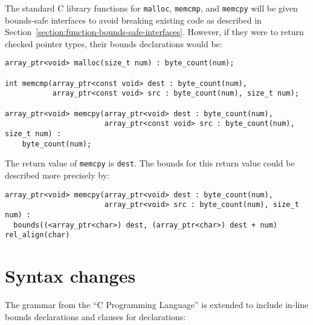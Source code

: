The standard C library functions for \texttt{malloc}, \texttt{memcmp}, and
\texttt{memcpy} will be
given bounds-safe interfaces to avoid breaking existing code as
described in Section~\ref{section:function-bounds-safe-interfaces}. 
However, if they were to return checked pointer
types, their bounds declarations would be:

\begin{verbatim}
array_ptr<void> malloc(size_t num) : byte_count(num);

int memcmp(array_ptr<const void> dest : byte_count(num),
           array_ptr<const void> src : byte_count(num), size_t num);

array_ptr<void> memcpy(array_ptr<void> dest : byte_count(num),
                       array_ptr<const void> src : byte_count(num), size_t num) :
    byte_count(num);
\end{verbatim}

The return value of \texttt{memcpy} is \texttt{dest}. The bounds for
this return value could be described more precisely by:

\begin{verbatim}
array_ptr<void> memcpy(array_ptr<void> dest : byte_count(num),
                       array_ptr<void> src : byte_count(num), size_t num) :
  bounds((<array_ptr<char>) dest, (array_ptr<char>) dest + num) rel_align(char)
\end{verbatim}
\section{Syntax changes}
The grammar from the ``C Programming Language'' \cite{Ritchie1988} is extended to include
in-line bounds declarations and  clauses for declarations:

